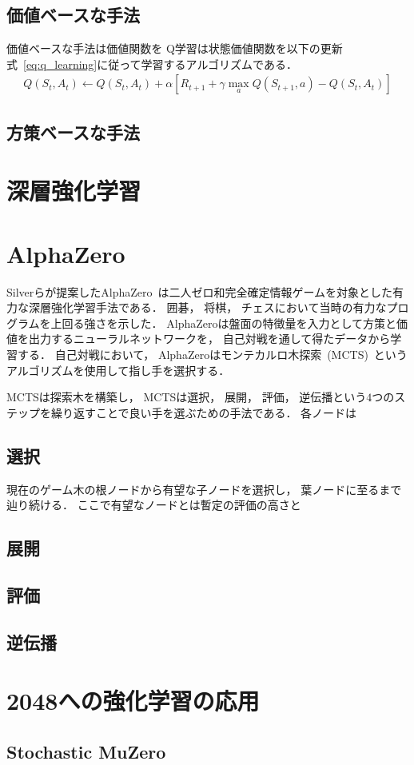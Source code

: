\subsection{価値ベースな手法}
価値ベースな手法は価値関数を
Q学習は状態価値関数を以下の更新式~\ref{eq:q_learning}に従って学習するアルゴリズムである．
\begin{align}
  \label{eq:q_learning}
  Q(S_t, A_t) \leftarrow Q(S_t, A_t) + \alpha [R_{t+1} + \gamma \max_a Q(S_{t+1}, a) - Q(S_t, A_t)]
\end{align}


\subsection{方策ベースな手法}

\section{深層強化学習}

\section{AlphaZero}
Silverらが提案したAlphaZero~\cite{AlphaZero}は二人ゼロ和完全確定情報ゲームを対象とした有力な深層強化学習手法である．
囲碁， 将棋， チェスにおいて当時の有力なプログラムを上回る強さを示した．
AlphaZeroは盤面の特徴量を入力として方策と価値を出力するニューラルネットワークを， 自己対戦を通して得たデータから学習する．
自己対戦において， AlphaZeroはモンテカルロ木探索~(MCTS)~というアルゴリズムを使用して指し手を選択する．

MCTSは探索木を構築し， 
MCTSは選択， 展開， 評価， 逆伝播という$4$つのステップを繰り返すことで良い手を選ぶための手法である．
各ノードは

\subsection*{選択}
現在のゲーム木の根ノードから有望な子ノードを選択し， 葉ノードに至るまで辿り続ける．
ここで有望なノードとは暫定の評価の高さと
\subsection*{展開}
\subsection*{評価}
\subsection*{逆伝播}

\section{2048への強化学習の応用}
\subsection{Stochastic MuZero}
